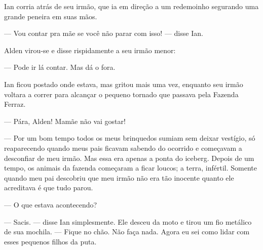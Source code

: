 
Ian corria atrás de seu irmão, que ia em direção a um redemoinho segurando uma
grande peneira em suas mãos.

--- Vou contar pra mãe se você não parar com isso! --- disse Ian.

Alden virou-se e disse rispidamente a seu irmão menor:

--- Pode ir lá contar. Mas dá o fora.

Ian ficou postado onde estava, mas gritou mais uma vez, enquanto seu irmão
voltara a correr para alcançar o pequeno tornado que passava pela Fazenda
Ferraz.

--- Pára, Alden! Mamãe não vai gostar!


--- Por um bom tempo todos os meus brinquedos sumiam sem deixar vestígio, só
reaparecendo quando meus pais ficavam sabendo do ocorrido e começavam a
desconfiar de meu irmão. Mas essa era apenas a ponta do iceberg. Depois de um
tempo, os animais da fazenda começaram a ficar loucos; a terra, infértil.
Somente quando meu pai descobriu que meu irmão não era tão inocente quanto ele
acreditava é que tudo parou.

--- O que estava acontecendo?

--- Sacis. --- disse Ian simplesmente. Ele desceu da moto e tirou um fio
metálico de sua mochila. --- Fique no chão. Não faça nada. Agora eu sei como
lidar com esses pequenos filhos da puta.

